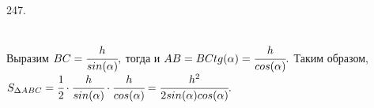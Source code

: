 247. \begin{figure}[ht!]
\end{figure}\\
Выразим $BC=\cfrac{h}{sin(\alpha)},$ тогда и $AB=BC tg(\alpha)=\cfrac{h}{cos(\alpha)}.$ Таким образом, $S_{\Delta ABC}=
\cfrac{1}{2}\cdot\cfrac{h}{sin(\alpha)}\cdot\cfrac{h}{cos(\alpha)}=
\cfrac{h^2}{2sin(\alpha)cos(\alpha)}.$\newpage\noindent
